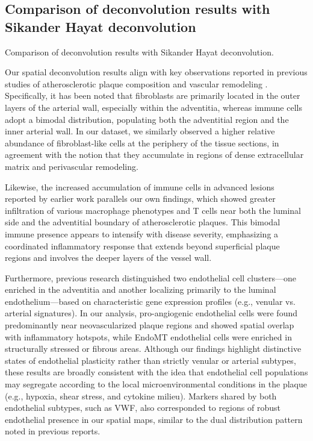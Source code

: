 \documentclass[a4paper,12pt]{article}
\begin{document}
\subsection{Comparison of deconvolution results with Sikander Hayat deconvolution}
Comparison of deconvolution results with Sikander Hayat deconvolution.

Our spatial deconvolution results align with key observations reported in previous studies of atherosclerotic plaque composition and vascular remodeling \citep{Bleckwehl2025-td}. Specifically, it has been noted that fibroblasts are primarily located in the outer layers of the arterial wall, especially within the adventitia, whereas immune cells adopt a bimodal distribution, populating both the adventitial region and the inner arterial wall. In our dataset, we similarly observed a higher relative abundance of fibroblast-like cells at the periphery of the tissue sections, in agreement with the notion that they accumulate in regions of dense extracellular matrix and perivascular remodeling. 

Likewise, the increased accumulation of immune cells in advanced lesions reported by earlier work parallels our own findings, which showed greater infiltration of various macrophage phenotypes and T cells near both the luminal side and the adventitial boundary of atherosclerotic plaques. This bimodal immune presence appears to intensify with disease severity, emphasizing a coordinated inflammatory response that extends beyond superficial plaque regions and involves the deeper layers of the vessel wall.

Furthermore, previous research distinguished two endothelial cell clusters—one enriched in the adventitia and another localizing primarily to the luminal endothelium—based on characteristic gene expression profiles (e.g., venular vs. arterial signatures). In our analysis, pro-angiogenic endothelial cells were found predominantly near neovascularized plaque regions and showed spatial overlap with inflammatory hotspots, while EndoMT endothelial cells were enriched in structurally stressed or fibrous areas. Although our findings highlight distinctive states of endothelial plasticity rather than strictly venular or arterial subtypes, these results are broadly consistent with the idea that endothelial cell populations may segregate according to the local microenvironmental conditions in the plaque (e.g., hypoxia, shear stress, and cytokine milieu). Markers shared by both endothelial subtypes, such as VWF, also corresponded to regions of robust endothelial presence in our spatial maps, similar to the dual distribution pattern noted in previous reports.
\end{document}
